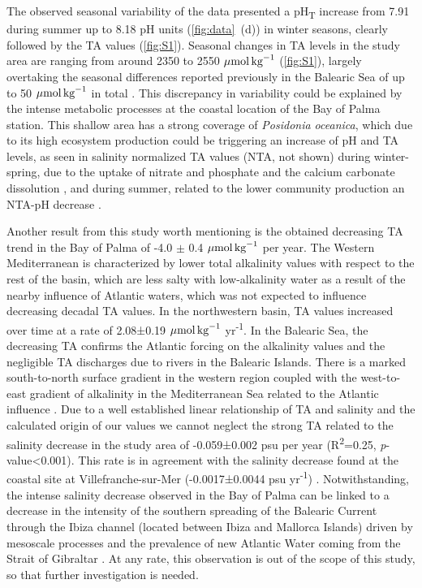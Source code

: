 The observed seasonal variability of the data presented a pH\textsubscript{T}
increase from 7.91 during summer up to 8.18 pH units
(\cref{fig:data}~\textcolor{ref_color}{(d)}) in
winter seasons, clearly followed by the TA values (\cref{fig:S1}). Seasonal
changes in TA levels in the study area are ranging from around 2350 to 2550
${\mu \textrm{mol\,kg}^{-1}}$ (\cref{fig:S1}), largely overtaking the seasonal
differences reported previously in the Balearic Sea of up to 50 ${\mu
            \textrm{mol\,kg}^{-1}}$ in total
\cite{cossarini2015spatiotemporal}. This discrepancy in variability could
be explained by the intense metabolic processes at the coastal location of the
Bay of Palma station. This shallow area has a strong coverage of
\emph{Posidonia oceanica}, which due to its high ecosystem
production \cite{koopmans2020high} could be triggering an increase of pH and TA
levels, as seen in salinity normalized TA values (NTA, not shown) during
winter-spring, due to the uptake of nitrate and phosphate and the calcium
carbonate dissolution \cite{barron2006organic,cossarini2015spatiotemporal}, and
during summer, related to the lower community
production \cite{champenois2012seasonal} an NTA-pH
decrease \cite{cossarini2015spatiotemporal}.

Another result from this study worth mentioning is the obtained
decreasing TA trend in the Bay of Palma of -4.0 $\pm$ 0.4 ${\mu
            \textrm{mol\,kg}^{-1}}$ per year. The Western Mediterranean is
characterized by lower total alkalinity values with respect to the rest of the
basin, which are less salty with low-alkalinity water
\cite{RIVARO2010236,hassoun2015modeling} as a result of the nearby influence of
Atlantic waters, which was not expected to influence decreasing decadal TA
values. In the northwestern basin, TA values increased over time at a rate of
2.08±0.19 ${\mu\textrm{mol\,kg}^{-1}}$ yr\textsuperscript{-1}. In the Balearic
Sea, the decreasing TA confirms the Atlantic forcing on the alkalinity values
and the negligible TA discharges due to rivers in the Balearic Islands. There
is a marked south-to-north surface gradient in the western region coupled with
the west-to-east gradient of alkalinity in the Mediterranean Sea related to the
Atlantic influence \cite{cossarini2015spatiotemporal,Gemayel2015}. Due to a
well established linear relationship of TA and
salinity \cite{schneider2007alkalinity} and the calculated origin of our
values \cite{Gemayel2015} we cannot neglect the strong TA related to the
salinity decrease in the study area of -0.059±0.002 psu per year
(R\textsuperscript{2}=0.25, \emph{p}-value<0.001). This rate is in agreement
with the salinity decrease found at the coastal site at Villefranche-sur-Mer
(-0.0017±0.0044 psu yr\textsuperscript{-1}) \cite{Kapsenberg2017}.
Notwithstanding, the intense salinity decrease observed in the Bay of Palma can
be linked to a decrease in the intensity of the southern spreading of the
Balearic Current through the Ibiza channel (located between Ibiza and Mallorca
Islands) driven by mesoscale processes and the prevalence of new Atlantic
Water coming from the Strait of Gibraltar \cite{millot1999circulation}.
At any rate, this observation is out of the scope of this study, so that
further investigation is needed.

